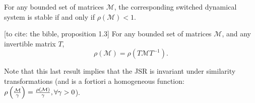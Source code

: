 \begin{property}
For any bounded set of matrices $\mathcal{M}$, the corresponding switched dynamical system is stable if and only if $\rho(\mathcal{M})<1$.
\end{property}

\begin{property}\label{rem:scaling}
[to cite: the bible, proposition 1.3]
For any bounded set of matrices $\mathcal{M}$, and any invertible matrix $T$, 
$$\rho(\mathcal{M})=\rho(T \mathcal{M} T^{-1}).$$
\end{property}

Note that this last result implies that the JSR is invariant under similarity transformations (and is a fortiori a homogeneous function: $\rho\left(\frac{\mathcal{M}}{\gamma}\right)=\frac{\rho(\mathcal{M})}{\gamma}, \forall \gamma > 0$).
